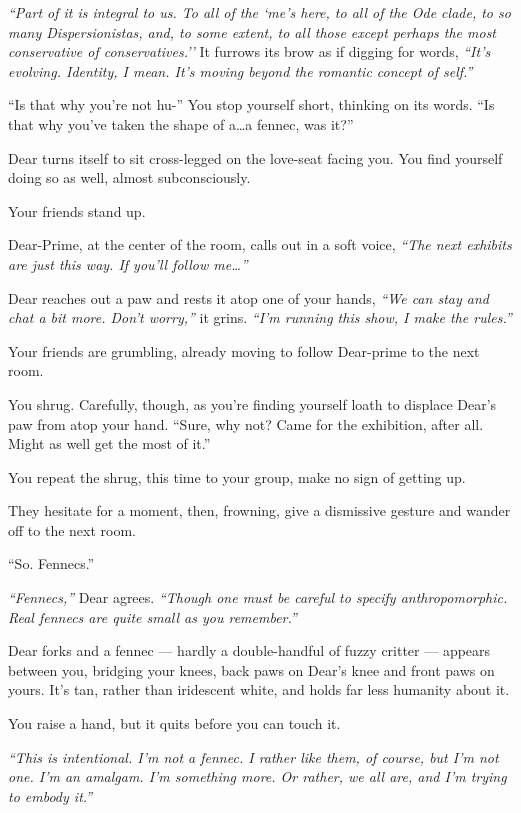 \emph{``Part of it is integral to us. To all of the `me's here, to all of the Ode clade, to so many Dispersionistas, and, to some extent, to all those except perhaps the most conservative of conservatives.''} It furrows its brow as if digging for words, \emph{``It's evolving. Identity, I mean. It's moving beyond the romantic concept of self.''}

``Is that why you're not hu-'' You stop yourself short, thinking on its words. ``Is that why you've taken the shape of a\ldots{}a fennec, was it?''

Dear turns itself to sit cross-legged on the love-seat facing you. You find yourself doing so as well, almost subconsciously.

Your friends stand up.

Dear-Prime, at the center of the room, calls out in a soft voice, \emph{``The next exhibits are just this way. If you'll follow me\ldots{}''}

Dear reaches out a paw and rests it atop one of your hands, \emph{``We can stay and chat a bit more. Don't worry,''} it grins. \emph{``I'm running this show, I make the rules.''}

Your friends are grumbling, already moving to follow Dear-prime to the next room.


You shrug. Carefully, though, as you're finding yourself loath to displace Dear's paw from atop your hand. ``Sure, why not? Came for the exhibition, after all. Might as well get the most of it.''

You repeat the shrug, this time to your group, make no sign of getting up.

They hesitate for a moment, then, frowning, give a dismissive gesture and wander off to the next room.

``So. Fennecs.''

\emph{``Fennecs,''} Dear agrees. \emph{``Though one must be careful to specify anthropomorphic. Real fennecs are quite small as you remember.''}

Dear forks and a fennec --- hardly a double-handful of fuzzy critter --- appears between you, bridging your knees, back paws on Dear's knee and front paws on yours. It's tan, rather than iridescent white, and holds far less humanity about it.

You raise a hand, but it quits before you can touch it.

\emph{``This is intentional. I'm not a fennec. I rather like them, of course, but I'm not one. I'm an amalgam. I'm something more. Or rather, we all are, and I'm trying to embody it.''}

